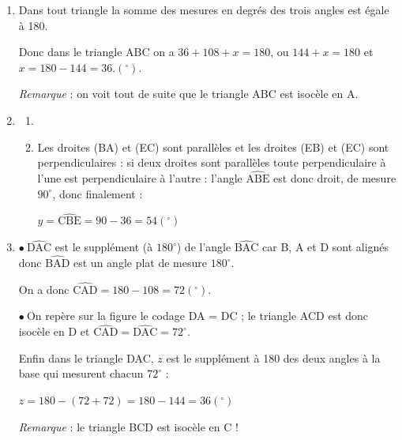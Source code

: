\medskip

%

\begin{enumerate}
\item %
Dans tout triangle la somme des mesures en degrés des trois angles est égale à 180.

Donc dans le triangle ABC on a $36 + 108 + x = 180$, ou $144 + x = 180$ et $x = 180 - 144 = 36.(^\circ)$.

\emph{Remarque }: on voit tout de suite que le triangle ABC est isocèle en A.
\item 
	\begin{enumerate}
		\item %


		\item %
Les droites (BA) et (EC) sont parallèles et les droites (EB) et (EC) sont perpendiculaires : si deux droites sont parallèles toute perpendiculaire à l'une est perpendiculaire à l'autre : l'angle $\widehat{\text{ABE}}$ est donc droit, de mesure $90^\circ$, donc finalement :

$y = \widehat{\text{CBE}} = 90 - 36 = 54(^\circ)$
	\end{enumerate}
\item %

$\bullet~\widehat{\text{DAC}}$ est le supplément (à $180^\circ$) de l'angle $\widehat{\text{BAC}}$ car B, A et D sont alignés donc $\widehat{\text{BAD}}$ est un angle plat de mesure $180^\circ$.

On a donc $\widehat{\text{CAD}} = 180 - 108 = 72(^\circ)$.

$\bullet~$On repère sur la figure le codage DA = DC ; le triangle ACD est donc isocèle en D et $\widehat{\text{CAD}} = \widehat{\text{DAC}} = 72^\circ$.

Enfin dans le triangle DAC, $z$ est le supplément à 180 des deux angles à la base qui mesurent chacun $72^\circ$ :

$z = 180 - (72 + 72) = 180 - 144 = 36(^\circ)$

\emph{Remarque} : le triangle BCD est isocèle en C !
\end{enumerate}

